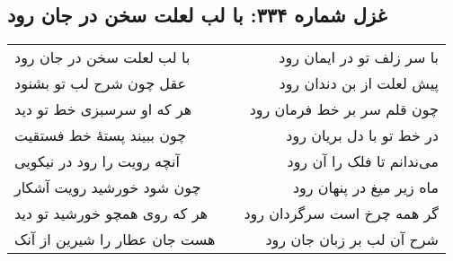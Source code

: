 \begin{center}
\section*{غزل شماره ۳۳۴: با لب لعلت سخن در جان رود}
\label{sec:334}
\begin{longtable}{l p{0.5cm} r}
با لب لعلت سخن در جان رود
&&
با سر زلف تو در ایمان رود
\\
عقل چون شرح لب تو بشنود
&&
پیش لعلت از بن دندان رود
\\
هر که او سرسبزی خط تو دید
&&
چون قلم سر بر خط فرمان رود
\\
چون ببیند پستهٔ خط فستقیت
&&
در خط تو با دل بریان رود
\\
آنچه رویت را رود در نیکویی
&&
می‌ندانم تا فلک را آن رود
\\
چون شود خورشید رویت آشکار
&&
ماه زیر میغ در پنهان رود
\\
هر که روی همچو خورشید تو دید
&&
گر همه چرخ است سرگردان رود
\\
هست جان عطار را شیرین از آنک
&&
شرح آن لب بر زبان جان رود
\\
\end{longtable}
\end{center}
